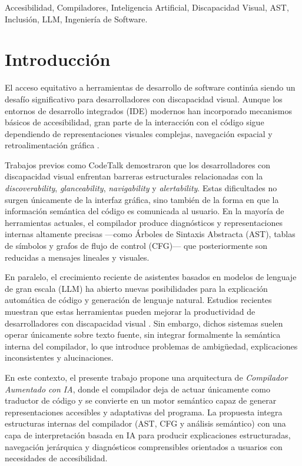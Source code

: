 \documentclass[conference]{IEEEtran}
\begin{document}
\begin{IEEEkeywords}
Accesibilidad, Compiladores, Inteligencia Artificial, Discapacidad Visual, AST, Inclusión, LLM, Ingeniería de Software.
\end{IEEEkeywords}

\section{Introducción}

El acceso equitativo a herramientas de desarrollo de software continúa siendo un desafío significativo para desarrolladores con discapacidad visual. Aunque los entornos de desarrollo integrados (IDE) modernos han incorporado mecanismos básicos de accesibilidad, gran parte de la interacción con el código sigue dependiendo de representaciones visuales complejas, navegación espacial y retroalimentación gráfica \cite{codetalk}.

Trabajos previos como CodeTalk \cite{codetalk} demostraron que los desarrolladores con discapacidad visual enfrentan barreras estructurales relacionadas con la \textit{discoverability}, \textit{glanceability}, \textit{navigability} y \textit{alertability}. Estas dificultades no surgen únicamente de la interfaz gráfica, sino también de la forma en que la información semántica del código es comunicada al usuario. En la mayoría de herramientas actuales, el compilador produce diagnósticos y representaciones internas altamente precisas —como Árboles de Sintaxis Abstracta (AST), tablas de símbolos y grafos de flujo de control (CFG)— que posteriormente son reducidas a mensajes lineales y visuales.

En paralelo, el crecimiento reciente de asistentes basados en modelos de lenguaje de gran escala (LLM) ha abierto nuevas posibilidades para la explicación automática de código y generación de lenguaje natural. Estudios recientes muestran que estas herramientas pueden mejorar la productividad de desarrolladores con discapacidad visual \cite{genai_accessibility}. Sin embargo, dichos sistemas suelen operar únicamente sobre texto fuente, sin integrar formalmente la semántica interna del compilador, lo que introduce problemas de ambigüedad, explicaciones inconsistentes y alucinaciones.

En este contexto, el presente trabajo propone una arquitectura de \textit{Compilador Aumentado con IA}, donde el compilador deja de actuar únicamente como traductor de código y se convierte en un motor semántico capaz de generar representaciones accesibles y adaptativas del programa. La propuesta integra estructuras internas del compilador (AST, CFG y análisis semántico) con una capa de interpretación basada en IA para producir explicaciones estructuradas, navegación jerárquica y diagnósticos comprensibles orientados a usuarios con necesidades de accesibilidad.
\end{document}
